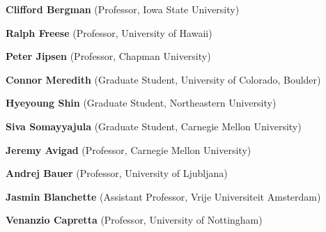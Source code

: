 \documentclass[11pt]{amsart}  %
\begin{document}
\vskip2mm
\hskip4.7mm {\bf Clifford Bergman} (Professor, Iowa State University)

\vskip2mm
\hskip4.7mm {\bf Ralph Freese} (Professor, University of Hawaii)

\vskip2mm
\hskip4.7mm {\bf Peter Jipsen} (Professor, Chapman University)

\vskip2mm
\hskip4.7mm {\bf Connor Meredith} (Graduate Student, University of Colorado, Boulder)

\vskip2mm
\hskip4.7mm {\bf Hyeyoung Shin} (Graduate Student, Northeastern University)

\vskip2mm
\hskip4.7mm {\bf Siva Somayyajula} (Graduate Student, Carnegie Mellon University)



\vskip5mm


\vskip2mm
\hskip4.7mm {\bf Jeremy Avigad} (Professor, Carnegie Mellon University)

\vskip2mm
\hskip4.7mm {\bf Andrej Bauer} (Professor, University of Ljubljana)

\vskip2mm
\hskip4.7mm {\bf Jasmin Blanchette} (Assistant Professor, Vrije Universiteit Amsterdam)

\vskip2mm
\hskip4.7mm {\bf Venanzio Capretta} (Professor, University of Nottingham)


  







\end{document}
